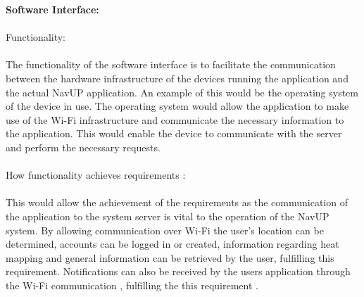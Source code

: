 \documentclass{article}
\begin{document}
{\textbf{Software Interface:}\\\\
Functionality:\\\\
The functionality of the software interface is to facilitate the communication between the hardware infrastructure of the devices running the application and the actual NavUP application. An example of this would be the operating system of the device in use. The operating system would allow the application to make use of the Wi-Fi infrastructure and communicate the necessary information to the application. This would enable the device to communicate with the server and perform the necessary requests.\\\\
How functionality achieves requirements :\\\\
This would allow the achievement of the requirements as the communication of the application to the system server is vital to the operation of the NavUP system. By allowing communication over Wi-Fi the user's location can be determined, accounts can be logged in or created, information regarding heat mapping and general information can be retrieved by the user, fulfilling this requirement. Notifications can also be received by the users application through the Wi-Fi communication , fulfilling the this requirement .}

		
\end{document}
